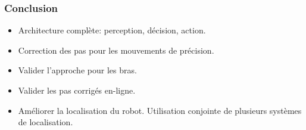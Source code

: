 \documentclass[14pt,utf8x,hyperref={pdfpagelabels=false}]{beamer}
\begin{document}
\begin{frame}
  \frametitle{Conclusion}

  \begin{itemize}
  \item Architecture complète: perception, décision, action.
  \item Correction des pas pour les mouvements de précision.
  \end{itemize}

  \bigskip

  \begin{itemize}
  \item Valider l'approche pour les bras.
  \item Valider les pas corrigés en-ligne.
  \item Améliorer la localisation du robot. Utilisation conjointe de
    plusieurs systèmes de localisation.
  \end{itemize}
\end{frame}



%
%


\end{document}
